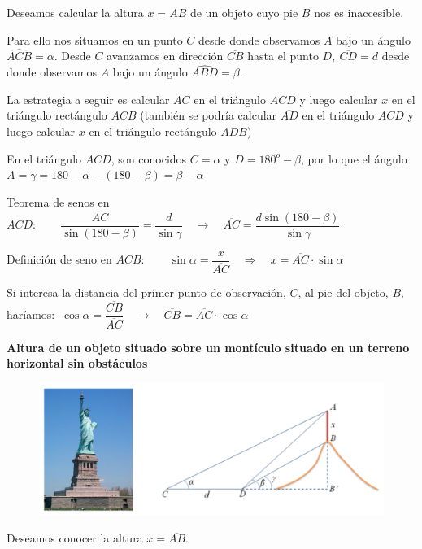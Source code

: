 Deseamos calcular la altura $x=\overline{AB}$ de un objeto cuyo pie $B$ nos es inaccesible.

Para ello nos situamos en un punto $C$ desde donde observamos $A$ bajo un ángulo $\widehat{ACB}=\alpha$. Desde $C$ avanzamos en dirección $\overline{CB}$ hasta el punto $D,\ \overline{CD}=d$ desde donde observamos $A$ bajo un ángulo $\widehat{ABD}=\beta$.

La estrategia a seguir es calcular $\overline{AC}$ en el triángulo $ACD$ y luego calcular $x$ en el triángulo rectángulo $ACB$ \textcolor{gris}{(también se podría calcular $\overline{AD}$ en el triángulo $ACD$ y luego calcular $x$ en el triángulo rectángulo $ADB$)}

En el triángulo $ACD$, son conocidos $C=\alpha$ y $D=180^o-\beta$, por lo que el ángulo $A=\gamma=180-\alpha-(180-\beta)=\beta-\alpha$

Teorema de senos en $ACD:\qquad \dfrac{\overline{AC}}{\sin(180-\beta)}=\dfrac{d}{\sin \gamma} \quad \to \quad \overline{AC}=\dfrac{d\sin(180-\beta)}{\sin \gamma}$

Definición de seno en $ACB:\qquad \sin \alpha=\dfrac{x}{\overline{AC}} \quad \Rightarrow \quad x=\overline{AC} \cdot \sin \alpha$

\textcolor{gris}{Si interesa la distancia del primer punto de observación, $C$, al pie del objeto, $B$, haríamos: $\ \cos \alpha=\dfrac{\overline{CB}}{\overline{AC}} \quad \to \quad \overline{CB}=\overline{AC} \cdot \cos \alpha$}

\vspace{8mm}
\begin{large}
\textbf{Altura de un objeto situado sobre un montículo situado en un terreno horizontal sin obstáculos}	
\end{large}

\begin{figure}[H]
	\centering
	\includegraphics[width=.9\textwidth]{img-triang/topog05.png}
\end{figure}

Deseamos conocer la altura $x=\overline{AB}$.

